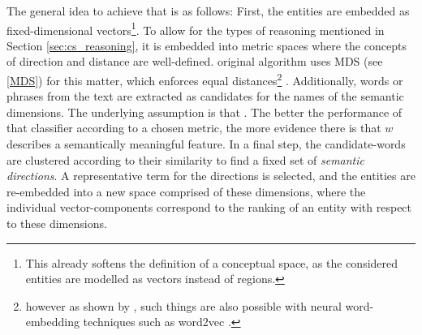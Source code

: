 The general idea to achieve that is as follows: First, the entities %
are embedded as fixed-dimensional vectors\footnote{This already softens the definition of a conceptual space, as the considered entities are modelled as vectors instead of regions.}. %
To allow for the types of reasoning mentioned in Section \ref{sec:cs_reasoning}, %
it is embedded into metric spaces where the concepts of direction and distance are well-defined.  original algorithm uses MDS (see \ref{MDS}) for this matter, which enforces equal distances\footnote{however as shown by \textcite{Mikolov:Regularities}, such things are also possible with neural word-embedding techniques such as word2vec \cite{Mikolov2013}.}%
. Additionally, words or phrases from the text are extracted as candidates for the names of the semantic dimensions. The underlying assumption is that  \cite[3574]{Alshaikh2020}. The better the performance of that classifier according to a chosen metric, the more evidence there is that $w$ describes a semantically meaningful feature. 
In a final step, the candidate-words are clustered according to their similarity to find a fixed set of \emph{semantic directions}. A representative term for the directions is selected, and the entities are re-embedded into a new space comprised of these dimensions, where the individual vector-components correspond to the ranking of an entity with respect to these dimensions.
\newline



